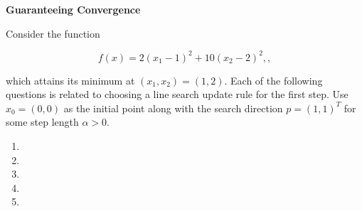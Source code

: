 \textbf{Guaranteeing Convergence}

Consider the function

$$
f(x) = 2(x_1 - 1)^2 + 10(x_2 - 2)^2,,
$$

which attains its minimum at $(x_1, x_2) = (1, 2)$. Each of the following questions is related to choosing a line search
update rule for the first step. Use $x_0 = (0, 0)$ as the initial point along with the search direction $p = (1, 1)^T$ 
for some step length $\alpha > 0$.

\begin{enumerate}
    \item 
    \pagebreak
    \item 
    \pagebreak
    \item 
    \pagebreak
    \item 
    \pagebreak
    \item 
    \pagebreak
\end{enumerate}